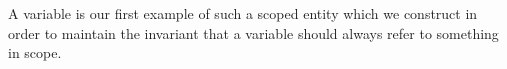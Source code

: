 A variable is our first example of such a scoped entity which we
construct in order to maintain the invariant that a variable should
always refer to something in scope.


\begin{code}%
\>[0]\AgdaSpace{}%
\AgdaSpace{}%
\AgdaSymbol{:}\AgdaSpace{}%
\AgdaSpace{}%
\<%
\\
\>[0][@{}l@{\AgdaIndent{0}}]%
\>[2]\AgdaSpace{}%
\AgdaSymbol{:}\AgdaSpace{}%
\AgdaSpace{}%
\AgdaSymbol{(}\AgdaSpace{}%
\AgdaSymbol{)}\<%
\\
%
\>[2]\AgdaSpace{}%
\AgdaSymbol{:}\AgdaSpace{}%
\AgdaSpace{}%
\AgdaSpace{}%
\AgdaSpace{}%
\AgdaSpace{}%
\AgdaSymbol{(}\AgdaSpace{}%
\AgdaSymbol{)}\<%
\end{code}

